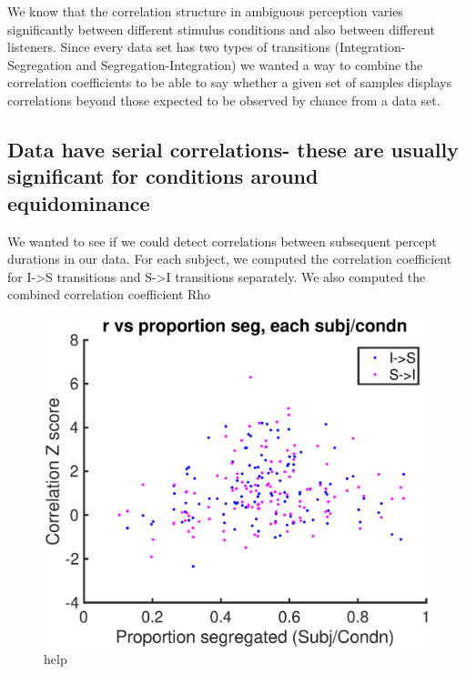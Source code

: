 

We know that the correlation structure in ambiguous perception varies significantly between different stimulus conditions and also between different listeners. Since every data set has two types of transitions (Integration-Segregation and Segregation-Integration) we wanted a way to combine the correlation coefficients to be able to say whether a given set of samples displays correlations beyond those expected to be observed by chance from a data set. 

\subsection{Data have serial correlations- these are usually significant for conditions around equidominance}

We wanted to see if we could detect correlations between subsequent percept durations in our data. For each subject, we computed the correlation coefficient for I->S transitions and S->I transitions separately. We also computed the combined correlation coefficient Rho 


\begin{figure}
	\centering
	\includegraphics[scale=0.7]{ch3Figs/SC_rz_vs_propSplit.eps}
	\caption{help}
	\label{fig:SC_rz_vs_propSplit}
\end{figure}


